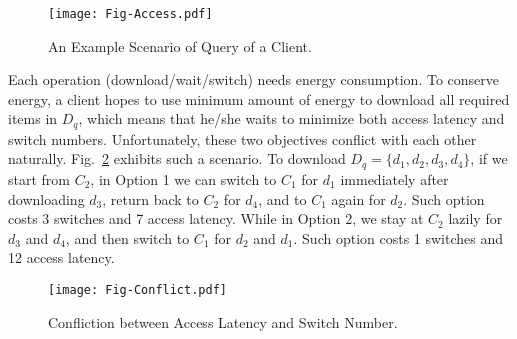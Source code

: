 \documentclass[12pt,a4paper]{article}
\theoremstyle{definition}
\begin{document}
\begin{enumerate}
\begin{figure}[!htbp]
	\centering
	\texttt{[image: Fig-Access.pdf]}
	\caption{An Example Scenario of Query of a Client.} \label{Fig-Access}
\end{figure}

Each operation (download/wait/switch) needs energy consumption. To conserve energy, a client hopes to use minimum amount of energy to download all required items in $D_q$, which means that he/she waits to minimize both access latency and switch numbers. Unfortunately, these two objectives conflict with each other naturally. Fig.~\ref{Fig-Conflict} exhibits such a scenario. To download $D_q=\{d_1, d_2, d_3, d_4\}$, if we start from $C_2$, in Option 1 we can switch to $C_1$ for $d_1$ immediately after downloading $d_3$, return back to $C_2$ for $d_4$, and to $C_1$ again for $d_2$. Such option costs 3 switches and 7 access latency. While in Option 2, we stay at $C_2$ lazily for $d_3$ and $d_4$, and then switch to $C_1$ for $d_2$ and $d_1$. Such option costs 1 switches and 12 access latency.


\begin{figure}[!htbp]
	\centering
	\texttt{[image: Fig-Conflict.pdf]}
	\caption{Confliction between Access Latency and Switch Number.} \label{Fig-Conflict}
\end{figure}


\end{enumerate}
\end{document}
